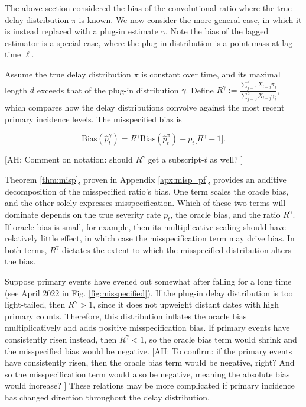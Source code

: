 \documentclass{article}
\newcommand{\ahcomment}[1]{{\color{red}[AH: #1]}}
\begin{document}
The above section considered the bias of the convolutional ratio where the true delay distribution $\pi$ is known. We now consider the more general case, in which it is instead replaced with a plug-in estimate $\gamma$. Note the bias of the lagged estimator is a special case, where the plug-in distribution is a point mass at lag time $\ell$. 

\begin{theorem}\label{thm:misp}
Assume the true delay distribution $\pi $ is constant over time, and its maximal length $d$ exceeds that of the plug-in distribution $\gamma$. 
Define $R^\gamma := \frac{\sum_{j=0}^d X_{t-j}\pi_j}{\sum_{j=0}^d X_{t-j}\gamma_j}$, which compares how the delay distributions convolve against the most recent primary incidence levels. The misspecified bias is

\begin{equation}\label{eq:MispBias}
          \text{Bias}(\hat{p}_t^\gamma) = R^\gamma\text{Bias}(\hat{p}_t^\pi) + p_t\big[ R^\gamma-1\big].
\end{equation}
\end{theorem}
\ahcomment{
  Comment on notation: should $R^\gamma$ get a subscript-$t$ as well?
}

Theorem \ref{thm:misp}, proven in Appendix \ref{apx:misp_pf}, provides an additive decomposition of the misspecified ratio's bias. One term scales the oracle bias, and the other solely expresses misspecification. Which of these two terms will dominate depends on the true severity rate $p_t$, the oracle bias, and the ratio $R^\gamma$. If oracle bias is small, for example, then its multiplicative scaling should have relatively little effect, in which case the misspecification term may drive bias. In both terms, $R^\gamma$ dictates the extent to which the misspecified distribution alters the bias.

Suppose primary events have evened out somewhat after falling for a long time (see April 2022 in Fig. \ref{fig:misspecified}). If the plug-in delay distribution is too light-tailed, then $R^\gamma>1$, since it does not upweight distant dates with high primary counts. Therefore, this distribution inflates the oracle bias multiplicatively and adds positive misspecification bias. If primary events have consistently risen instead, then $R^\gamma < 1$, so the oracle bias term would shrink and the misspecified bias would be negative.
\ahcomment{
  To confirm: if the primary events have consistently risen, then the oracle
  bias term would be negative, right?  And so the misspecification term would
  also be negative, meaning the absolute bias would increase?
}
These relations may be more complicated if primary incidence has changed direction throughout the delay distribution.
\end{document}
